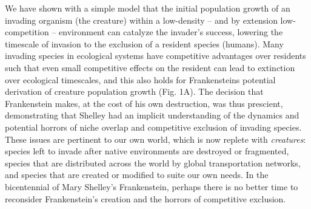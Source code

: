 \documentclass{article}[10pt]
\begin{document}

We have shown with a simple model that the initial population growth of an invading organism (the creature) within a low-density -- and by extension low-competition -- environment can catalyze the invader's success, lowering the timescale of invasion to the exclusion of a resident species (humans).
Many invading species in ecological systems have competitive advantages over residents such that even small competitive effects on the resident can lead to extinction over ecological timescales, and this also holds for Frankensteins potential derivation of creature population growth (Fig. 1A).
The decision that Frankenstein makes, at the cost of his own destruction, was thus prescient, demonstrating that Shelley had an implicit understanding of the dynamics and potential horrors of niche overlap and competitive exclusion of invading species.
These issues are pertinent to our own world, which is now replete with \emph{creatures}:
species left to invade after native environments are destroyed or fragmented,
species that are distributed across the world by global transportation networks,
and species that are created or modified to suite our own needs.
In the bicentennial of Mary Shelley's Frankenstein, perhaps there is no better time to reconsider Frankenstein's creation and the horrors of competitive exclusion.
\end{document}
